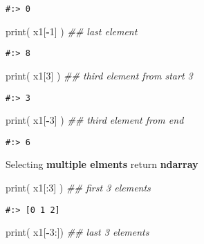 \documentclass[
]{book}
\newenvironment{Shaded}{\begin{snugshade}}{\end{snugshade}}
\newcommand{\BuiltInTok}[1]{#1}
\newcommand{\CommentTok}[1]{\textcolor[rgb]{0.37,0.37,0.37}{\textit{#1}}}
\newcommand{\DecValTok}[1]{\textcolor[rgb]{0.06,0.06,0.06}{#1}}
\newcommand{\NormalTok}[1]{#1}
\newcommand{\OperatorTok}[1]{\textcolor[rgb]{0.43,0.43,0.43}{\textbf{#1}}}
\begin{document}
\begin{verbatim}
#:> 0
\end{verbatim}

\begin{Shaded}
\begin{Highlighting}[]
\BuiltInTok{print}\NormalTok{( x1[}\OperatorTok{{-}}\DecValTok{1}\NormalTok{]  )  }\CommentTok{\#\# last element}
\end{Highlighting}
\end{Shaded}

\begin{verbatim}
#:> 8
\end{verbatim}

\begin{Shaded}
\begin{Highlighting}[]
\BuiltInTok{print}\NormalTok{( x1[}\DecValTok{3}\NormalTok{]   )  }\CommentTok{\#\# third element from start 3}
\end{Highlighting}
\end{Shaded}

\begin{verbatim}
#:> 3
\end{verbatim}

\begin{Shaded}
\begin{Highlighting}[]
\BuiltInTok{print}\NormalTok{( x1[}\OperatorTok{{-}}\DecValTok{3}\NormalTok{]  )  }\CommentTok{\#\# third element from end}
\end{Highlighting}
\end{Shaded}

\begin{verbatim}
#:> 6
\end{verbatim}

Selecting \textbf{multiple elments} return \textbf{ndarray}

\begin{Shaded}
\begin{Highlighting}[]
\BuiltInTok{print}\NormalTok{( x1[:}\DecValTok{3}\NormalTok{]  )  }\CommentTok{\#\# first 3 elements}
\end{Highlighting}
\end{Shaded}

\begin{verbatim}
#:> [0 1 2]
\end{verbatim}

\begin{Shaded}
\begin{Highlighting}[]
\BuiltInTok{print}\NormalTok{( x1[}\OperatorTok{{-}}\DecValTok{3}\NormalTok{:])   }\CommentTok{\#\# last 3 elements}
\end{Highlighting}
\end{Shaded}
\end{document}
